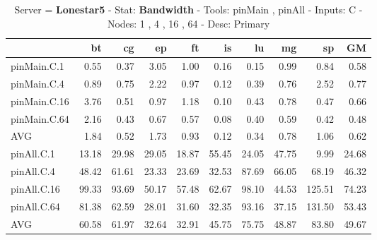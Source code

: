 \begin{table*}[]
\caption{Server = \textbf{Lonestar5} - Stat: \textbf{Bandwidth} - 
 Tools: pinMain , pinAll -
 Inputs: C -
 Nodes: 1 , 4 , 16 , 64 -
 Desc: Primary}
\label{ls5_bw_pMpA_C_itn_p3.5}\begin{center}
\begin{tabular}{lrrrrrrrrr}
\hline
              &    bt &    cg &    ep &    ft &    is &    lu &    mg &     sp &    GM \\
\hline
 pinMain.C.1  &  0.55 &  0.37 &  3.05 &  1.00 &  0.16 &  0.15 &  0.99 &   0.84 &  0.58 \\
 pinMain.C.4  &  0.89 &  0.75 &  2.22 &  0.97 &  0.12 &  0.39 &  0.76 &   2.52 &  0.77 \\
 pinMain.C.16 &  3.76 &  0.51 &  0.97 &  1.18 &  0.10 &  0.43 &  0.78 &   0.47 &  0.66 \\
 pinMain.C.64 &  2.16 &  0.43 &  0.67 &  0.57 &  0.08 &  0.40 &  0.59 &   0.42 &  0.48 \\
 AVG          &  1.84 &  0.52 &  1.73 &  0.93 &  0.12 &  0.34 &  0.78 &   1.06 &  0.62 \\
 pinAll.C.1   & 13.18 & 29.98 & 29.05 & 18.87 & 55.45 & 24.05 & 47.75 &   9.99 & 24.68 \\
 pinAll.C.4   & 48.42 & 61.61 & 23.33 & 23.69 & 32.53 & 87.69 & 66.05 &  68.19 & 46.32 \\
 pinAll.C.16  & 99.33 & 93.69 & 50.17 & 57.48 & 62.67 & 98.10 & 44.53 & 125.51 & 74.23 \\
 pinAll.C.64  & 81.38 & 62.59 & 28.01 & 31.60 & 32.35 & 93.16 & 37.15 & 131.50 & 53.43 \\
 AVG          & 60.58 & 61.97 & 32.64 & 32.91 & 45.75 & 75.75 & 48.87 &  83.80 & 49.67 \\
\hline
\end{tabular}
\end{center}
\end{table*}
